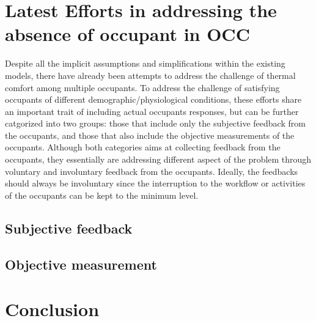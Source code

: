 \documentclass[review]{elsarticle}
\begin{document}
\section{Latest Efforts in addressing the absence of occupant in OCC}
Despite all the implicit assumptions and simplifications within the existing models, there have already been attempts to address the challenge of thermal comfort among multiple occupants. To address the challenge of satisfying occupants of different demographic/physiological conditions, these efforts share an important trait of including actual occupants responses, but can be further catgorized into two groups: those that include only the subjective feedback from the occupants, and those that also include the objective measurements of the occupants\cite{bortolini_analysis_2019}. Although both categories aims at collecting feedback from the occupants, they essentially are addressing different aspect of the problem through voluntary and involuntary feedback from the occupants. Ideally, the feedbacks should always be involuntary since the interruption to the workflow or activities of the occupants can be kept to the minimum level. 
    \subsection{Subjective feedback}
    
    \subsection{Objective measurement}
    
\section{Conclusion}


\end{document}
